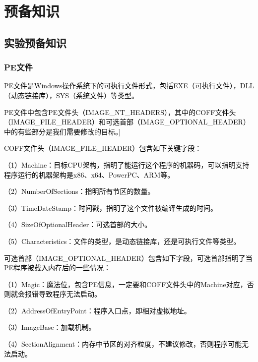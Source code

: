 
\chapter{预备知识}

\section{实验预备知识}

\subsection{PE文件}

\textcolor{black}{PE文件是Windows操作系统下的可执行文件形式，包括EXE（可执行文件），DLL（动态链接库），SYS（系统文件）等类型。}

\textcolor{black}{PE文件中包含PE文件头（IMAGE\_NT\_HEADERS），其中的COFF文件头（IMAGE\_FILE\_HEADER）和可选首部（IMAGE\_OPTIONAL\_HEADER）中的有些部分是我们需要修改的目标。}]

\textcolor{black}{COFF文件头（IMAGE\_FILE\_HEADER）包含如下关键字段：}

\textcolor{black}{（1）Machine：目标CPU架构，指明了能运行这个程序的机器码，可以指明支持程序运行的机器架构是x86、x64、PowerPC、ARM等。}

\textcolor{black}{（2）NumberOfSections：指明所有节区的数量。}

\textcolor{black}{（3）TimeDateStamp：时间戳，指明了这个文件被编译生成的时间。}

\textcolor{black}{（4）SizeOfOptionalHeader：可选首部的大小。}

\textcolor{black}{（5）Characteristics：文件的类型，是动态链接库，还是可执行文件等类型。}

\textcolor{black}{可选首部（IMAGE\_OPTIONAL\_HEADER）包含如下字段，可选首部指明了当PE程序被载入内存后的一些情况：}

\textcolor{black}{（1）Magic：魔法位，包含PE信息，一定要和COFF文件头中的Machine对应，否则就会报错导致程序无法启动。}

\textcolor{black}{（2）AddressOfEntryPoint：程序入口点，即相对虚拟地址。}

\textcolor{black}{（3）ImageBase：加载机制。}

\textcolor{black}{（4）SectionAlignment：内存中节区的对齐粒度，不建议修改，否则程序可能无法启动。}

